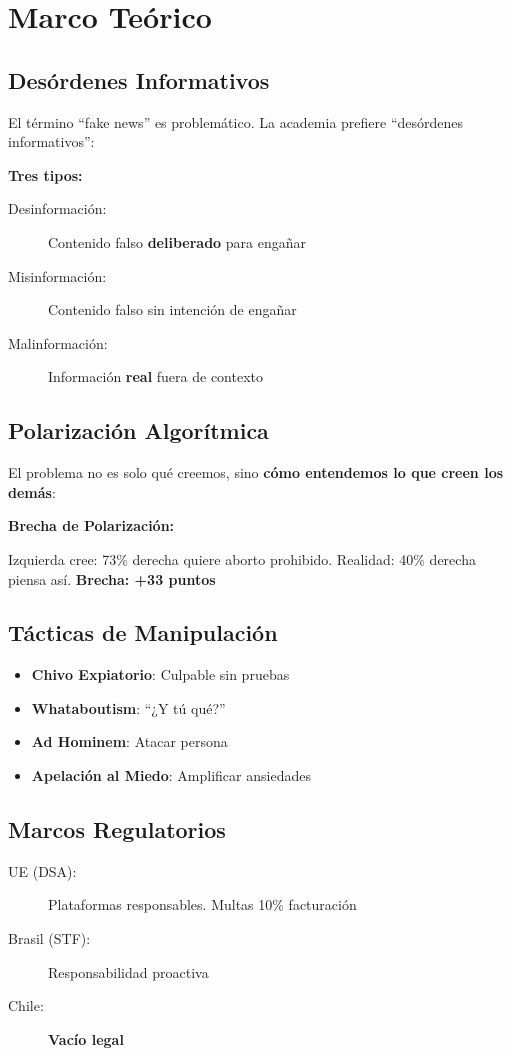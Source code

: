 
\hypertarget{sec2}{\section{Marco Teórico}}\label{sec2}

\subsection{Desórdenes Informativos}

El término ``fake news'' es problemático. La academia prefiere ``desórdenes informativos'':

\begin{keypoint}
\textbf{Tres tipos:}
\begin{description}
    \item[Desinformación:] Contenido falso \textbf{deliberado} para engañar
    \item[Misinformación:] Contenido falso sin intención de engañar
    \item[Malinformación:] Información \textbf{real} fuera de contexto
\end{description}
\end{keypoint}

\subsection{Polarización Algorítmica}

El problema no es solo qué creemos, sino \textbf{cómo entendemos lo que creen los demás}:

\begin{highlight}
\textbf{Brecha de Polarización:}

Izquierda cree: 73\% derecha quiere aborto prohibido.
Realidad: 40\% derecha piensa así.
\textbf{Brecha: +33 puntos}
\end{highlight}

\subsection{Tácticas de Manipulación}

\begin{itemize}
    \itemsep=0.1cm
    \item \textbf{Chivo Expiatorio}: Culpable sin pruebas
    \item \textbf{Whataboutism}: ``¿Y tú qué?''
    \item \textbf{Ad Hominem}: Atacar persona
    \item \textbf{Apelación al Miedo}: Amplificar ansiedades
\end{itemize}

\subsection{Marcos Regulatorios}

\begin{description}
    \item[UE (DSA):] Plataformas responsables. Multas 10\% facturación
    \item[Brasil (STF):] Responsabilidad proactiva
    \item[Chile:] \textbf{Vacío legal}
\end{description}

